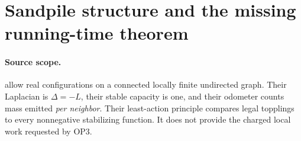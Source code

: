 \section{Sandpile structure and the missing running-time theorem}
\label{sec:op3-sandpile-source-mapping}

\paragraph{Source scope.}
\citet[Definitions 2.1--2.4 and Proposition 2.5, pp.\ 6--8]{levine2016critical}
allow real configurations on a connected locally finite undirected graph.
Their Laplacian is $\Delta=-L$, their stable capacity is one, and their
odometer counts mass emitted \emph{per neighbor}. Their least-action
principle compares legal topplings to every nonnegative stabilizing
function. It does not provide the charged local work requested by OP3.

